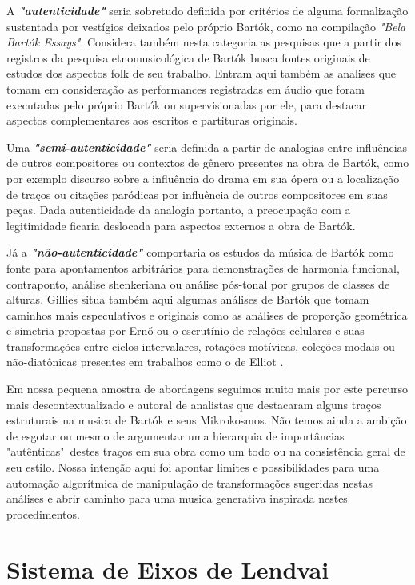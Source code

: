 \documentclass[
	12pt,				%
	openright,			%
	twoside,			%
	a4paper,			%
	english,			%
	french,				%
	spanish,			%
	brazil				%
	]{abntex2}
\begin{document}
\pagebreak
A \textit{\textbf{"autenticidade"}} seria sobretudo definida por critérios de alguma formalização sustentada por vestígios deixados pelo próprio Bartók, como na compilação \textit{"Bela Bartók Essays"}\cite{bartok1993bela}. Considera também nesta categoria as pesquisas que a partir dos registros da pesquisa etnomusicológica de Bartók busca fontes originais de estudos dos aspectos folk de seu trabalho. Entram aqui também as analises que tomam em consideração as performances registradas em áudio que foram executadas pelo próprio Bartók ou supervisionadas por ele, para destacar aspectos complementares aos escritos e partituras originais. 

Uma \textit{\textbf{"semi-autenticidade"}} seria definida a partir de analogias entre influências de outros compositores ou contextos de gênero presentes na obra de Bartók, como por exemplo discurso sobre a influência do drama em sua ópera ou a localização de traços ou citações paródicas por influência de outros compositores em suas peças. Dada autenticidade da analogia portanto, a preocupação com a legitimidade ficaria deslocada para aspectos externos a obra de Bartók.

Já a \textit{\textbf{"não-autenticidade"}} comportaria os estudos da música de Bartók como fonte para apontamentos arbitrários para demonstrações de harmonia funcional, contraponto, análise shenkeriana ou análise pós-tonal por grupos de classes de alturas. Gillies situa também aqui algumas análises de Bartók que tomam caminhos mais especulativos e originais como as análises de proporção geométrica e simetria propostas por Ern{\H{o}}   ou o escrutínio de relações celulares e suas transformações entre ciclos intervalares, rotações motívicas, coleções modais ou não-diatônicas presentes em trabalhos como o de Elliot . 

Em nossa pequena amostra de abordagens seguimos muito mais por este percurso mais descontextualizado e autoral de analistas que destacaram alguns traços estruturais na musica de Bartók e seus Mikrokosmos. Não temos ainda a ambição de esgotar ou mesmo de argumentar uma hierarquia de importâncias "autênticas"\ destes traços em sua obra como um todo ou na consistência geral de seu estilo. Nossa intenção aqui foi apontar limites e possibilidades para uma automação algorítmica de manipulação de transformações sugeridas nestas análises e abrir caminho para uma musica generativa inspirada nestes procedimentos.

\section{Sistema de Eixos de Lendvai}
\label{lendvai_eixos}
\end{document}

